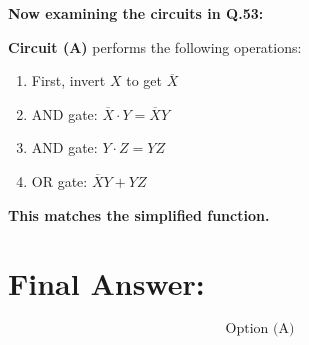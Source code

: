 \documentclass[a4paper,12pt]{article}
\begin{document}
\textbf{Now examining the circuits in Q.53:}

\textbf{Circuit (A)} performs the following operations:
\begin{enumerate}
    \item First, invert \( X \) to get \( \overline{X} \)
    \item AND gate: \( \overline{X} \cdot Y = \overline{X} Y \)
    \item AND gate: \( Y \cdot Z = Y Z \)
    \item OR gate: \( \overline{X} Y + Y Z \)
\end{enumerate}
\textbf{This matches the simplified function.}

\section*{Final Answer:}
\[
\boxed{\text{Option (A)}}
\]
\end{document}
